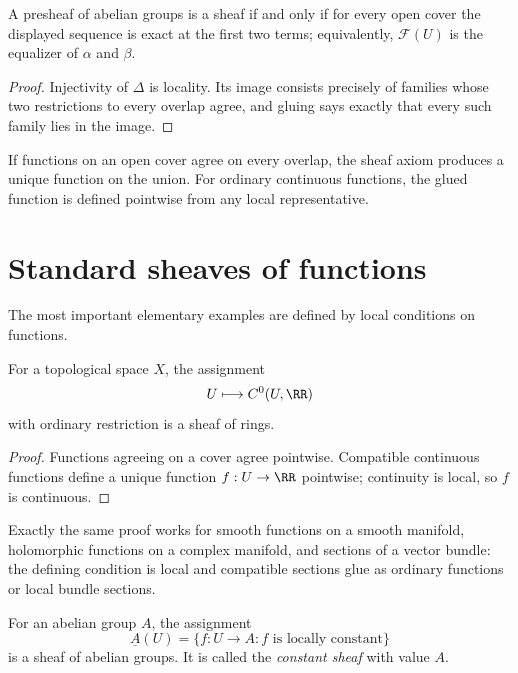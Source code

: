 

\begin{proposition}
A presheaf of abelian groups is a sheaf if and only if for every open cover the displayed
sequence is exact at the first two terms; equivalently, $\mathcal F(U)$ is the equalizer of
$\alpha$ and $\beta$.
\end{proposition}
\begin{proof}
Injectivity of $\Delta$ is locality.  Its image consists precisely of families whose two
restrictions to every overlap agree, and gluing says exactly that every such family lies in
the image.
\end{proof}

\begin{example}\label{ex:vi13-expand-01}
If functions on an open cover agree on every overlap, the sheaf axiom produces a unique function on the union.  For ordinary continuous functions, the glued function is defined pointwise from any local representative.
\end{example}
\section{Standard sheaves of functions}

The most important elementary examples are defined by local conditions on functions.

\begin{proposition}
For a topological space $X$, the assignment
\[
U\longmapsto C^0(U,\RR)
\]
with ordinary restriction is a sheaf of rings.
\end{proposition}
\begin{proof}
Functions agreeing on a cover agree pointwise.  Compatible continuous functions define a
unique function $f:U\to\RR$ pointwise; continuity is local, so $f$ is continuous.
\end{proof}

Exactly the same proof works for smooth functions on a smooth manifold, holomorphic
functions on a complex manifold, and sections of a vector bundle: the defining condition is
local and compatible sections glue as ordinary functions or local bundle sections.

\begin{proposition}
For an abelian group $A$, the assignment
\[
\underline A(U)=\{f:U\to A: f\text{ is locally constant}\}
\]
is a sheaf of abelian groups.  It is called the \emph{constant sheaf} with value $A$.
\end{proposition}

